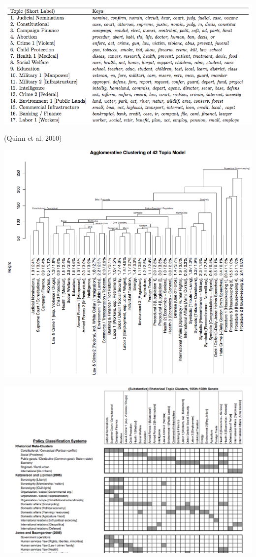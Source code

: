 \documentclass{mediumfoils}
\begin{document}
\centerline{\includegraphics[scale=.8]{pictures/topic-words}} 

{\footnotesize (Quinn et al. 2010)}


\centerline{\includegraphics[scale=.55]{pictures/topic-clustering}}


\centerline{\includegraphics[scale=.5]{pictures/other-schemes}}
\end{document}

